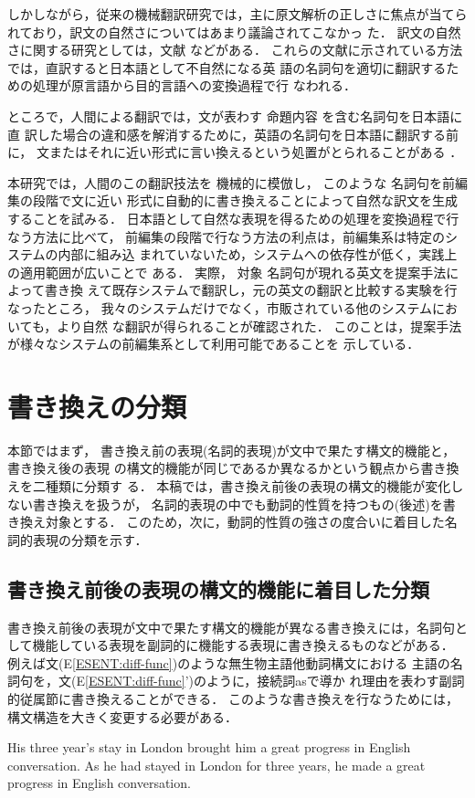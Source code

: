 しかしながら，従来の機械翻訳研究では，主に原文解析の正しさに焦点が当てら
れており\cite{Narita00}，訳文の自然さについてはあまり議論されてこなかっ
た\cite{Yoshimura95,Yamamoto99}．
訳文の自然さに関する研究としては，文献\cite{Nagao85,Somers88,Matsuo95}
などがある．
これらの文献に示されている方法では，直訳すると日本語として不自然になる英
語の名詞句を適切に翻訳するための処理が原言語から目的言語への変換過程で行
なわれる． 

ところで，人間による翻訳では，文が表わす
命題内容
を含む名詞句を日本語に直
訳した場合の違和感を解消するために，英語の名詞句を日本語に翻訳する前に，
文またはそれに近い形式に言い換えるという処置がとられることがある
\cite{Nida73,Anzai83}．

本研究では，人間のこの翻訳技法を
機械的に模倣し，
このような
名詞句を前編集の段階で文に近い
形式に自動的に書き換えることによって自然な訳文を生成することを試みる．
日本語として自然な表現を得るための処理を変換過程で行なう方法に比べて，
前編集の段階で行なう方法の利点は，前編集系は特定のシステムの内部に組み込
まれていないため，システムへの依存性が低く，実践上の適用範囲が広いことで
ある．
実際，
対象
名詞句が現れる英文を提案手法によって書き換
えて既存システムで翻訳し，元の英文の翻訳と比較する実験を行なったところ，
我々のシステムだけでなく，市販されている他のシステムにおいても，より自然
な翻訳が得られることが確認された．
このことは，提案手法が様々なシステムの前編集系として利用可能であることを
示している．

\section{書き換えの分類}
\label{sec:classify}

本節ではまず，
書き換え前の表現(名詞的表現)が文中で果たす構文的機能と，書き換え後の表現
の構文的機能が同じであるか異なるかという観点から書き換えを二種類に分類す
る．
本稿では，書き換え前後の表現の構文的機能が変化しない書き換えを扱うが，
名詞的表現の中でも動詞的性質を持つもの(後述)を書き換え対象とする．
このため，次に，動詞的性質の強さの度合いに着目した名詞的表現の分類を示す．

\subsection{書き換え前後の表現の構文的機能に着目した分類}
\label{sec:classify:syn-func}

書き換え前後の表現が文中で果たす構文的機能が異なる書き換えには，名詞句と
して機能している表現を副詞的に機能する表現に書き換えるものなどがある．
例えば文(E\ref{ESENT:diff-func})のような無生物主語他動詞構文における
主語の名詞句を，文(E\ref{ESENT:diff-func}')のように，接続詞asで導か
れ理由を表わす副詞的従属節に書き換えることができる\cite{Bekku75,Anzai83}．
このような書き換えを行なうためには，構文構造を大きく変更する必要がある．
\begin{ESENT}
\sentE His three year's stay in London brought him a great 
progress in English conversation.
\sentRewE As he had stayed in London for three years, he made a 
great progress in English conversation.
\label{ESENT:diff-func}
\end{ESENT}

